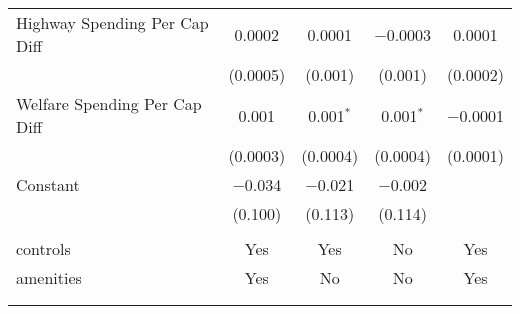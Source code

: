 \begin{table}[!htbp]
\begin{tabular}{@{\extracolsep{5pt}}lcccc}
  Highway Spending Per Cap Diff & 0.0002 & 0.0001 & $-$0.0003 & 0.0001 \\ 
  & (0.0005) & (0.001) & (0.001) & (0.0002) \\ 
  Welfare Spending Per Cap Diff & 0.001 & 0.001$^{*}$ & 0.001$^{*}$ & $-$0.0001 \\ 
  & (0.0003) & (0.0004) & (0.0004) & (0.0001) \\ 
  Constant & $-$0.034 & $-$0.021 & $-$0.002 &  \\ 
  & (0.100) & (0.113) & (0.114) &  \\ 
 \hline \\[-1.8ex] 
controls & Yes & Yes & No & Yes \\ 
amenities & Yes & No & No & Yes \\ 
\hline \\[-1.8ex] 
\hline 
\hline \\[-1.8ex] 
\end{tabular} 
\end{table} 
